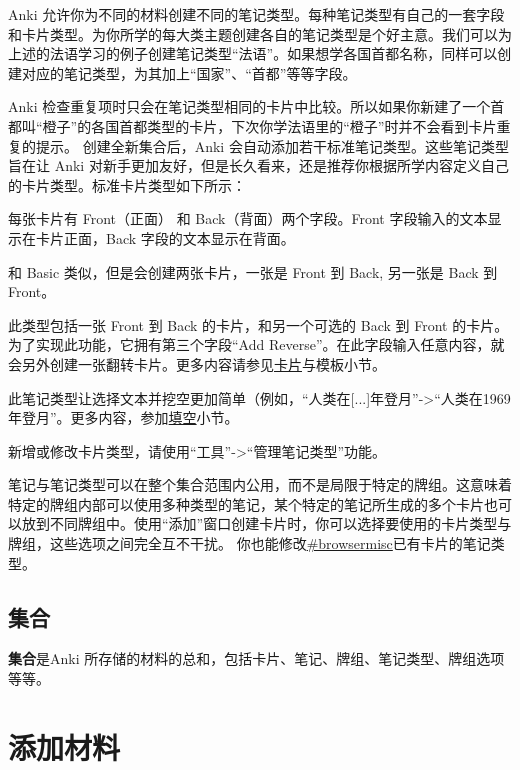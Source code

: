 \documentclass[a4paper]{book}
\begin{document}
	Anki 允许你为不同的材料创建不同的笔记类型。每种笔记类型有自己的一套字段和卡片类型。为你所学的每大类主题创建各自的笔记类型是个好主意。我们可以为上述的法语学习的例子创建笔记类型“法语”。如果想学各国首都名称，同样可以创建对应的笔记类型，为其加上“国家”、“首都”等等字段。
	
	Anki 检查重复项时只会在笔记类型相同的卡片中比较。所以如果你新建了一个首都叫“橙子”的各国首都类型的卡片，下次你学法语里的“橙子”时并不会看到卡片重复的提示。
	创建全新集合后，Anki 会自动添加若干标准笔记类型。这些笔记类型旨在让 Anki 对新手更加友好，但是长久看来，还是推荐你根据所学内容定义自己的卡片类型。标准卡片类型如下所示：
	
	\begin{description}
		\itemsep1pt\parskip0pt
		\item[Basic] 每张卡片有 Front（正面） 和 Back（背面）两个字段。Front 字段输入的文本显示在卡片正面，Back 字段的文本显示在背面。
		\item[标准（翻转卡片）] 和 Basic 类似，但是会创建两张卡片，一张是 Front 到 Back, 另一张是 Back 到 Front。
		\item[标准（可选翻转卡片）] 此类型包括一张 Front 到 Back 的卡片，和另一个可选的 Back 到 Front 的卡片。为了实现此功能，它拥有第三个字段“Add Reverse”。在此字段输入任意内容，就会另外创建一张翻转卡片。更多内容请参见\hyperref[templates]{卡片}与模板小节。
		\item[Cloze] 此笔记类型让选择文本并挖空更加简单（例如，“人类在[...]年登月”->“人类在1969年登月”。更多内容，参加\hyperref[cloze]{填空}小节。
	\end{description}
	
	新增或修改卡片类型，请使用“工具”->“管理笔记类型”功能。
	
	
	\begin{shaded}
		笔记与笔记类型可以在整个集合范围内公用，而不是局限于特定的牌组。这意味着特定的牌组内部可以使用多种类型的笔记，某个特定的笔记所生成的多个卡片也可以放到不同牌组中。使用“添加”窗口创建卡片时，你可以选择要使用的卡片类型与牌组，这些选项之间完全互不干扰。 你也能修改\url{#browsermisc}已有卡片的笔记类型。
	\end{shaded}
	
	\section{集合}
	
	\textbf{集合}是Anki 所存储的材料的总和，包括卡片、笔记、牌组、笔记类型、牌组选项等等。
	
	\chapter{添加材料}\label{}
	
\end{document}
